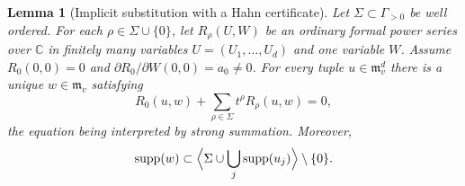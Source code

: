 \documentclass[11pt,letterpaper]{article}
\newtheorem{lemma}[lemma]{Lemma}
\theoremstyle{definition}
\newcommand{\C}{\mathbb C}
\newcommand{\supp}{\operatorname{supp}}
\newcommand{\m}{\mathfrak m}
\begin{document}
\begin{lemma}[Implicit substitution with a Hahn certificate]\label{tate:theta:lem:implicit}
Let $\Sigma\subset\Gamma_{>0}$ be well ordered. For each
$\rho\in\Sigma\cup\{0\}$, let $R_\rho(U,W)$ be an ordinary formal power
series over $\C$ in finitely many variables $U=(U_1,\ldots,U_d)$ and one
variable $W$. Assume $R_0(0,0)=0$ and
$\partial R_0/\partial W(0,0)=a_0\ne0$. For every tuple $u\in\m_v^d$ there
is a unique $w\in\m_v$ satisfying
\begin{equation}
 R_0(u,w)+\sum_{\rho\in\Sigma}t^\rho R_\rho(u,w)=0,\label{tate:theta:eq:implicit}
\end{equation}
the equation being interpreted by strong summation. Moreover,
\begin{equation}
 \supp(w)\subset
 \Bigl\langle\Sigma\cup\bigcup_j\supp(u_j)\Bigr\rangle\setminus\{0\}.
 \label{tate:theta:eq:implicitsupport}
\end{equation}
\end{lemma}
\end{document}
